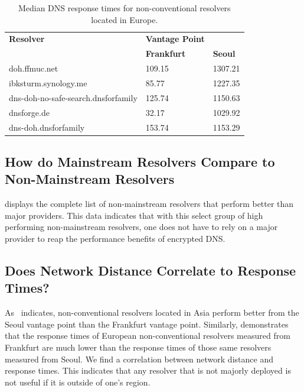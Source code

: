 \begin{table}
\centering
\begin{tabular}{lll}
\toprule
\textbf{Resolver} & \textbf{Vantage Point} & \\
                  & \textbf{Frankfurt}     & \textbf{Seoul} \\
\midrule
doh.ffmuc.net                               & 109.15                                           & 1307.21                         \\
ibksturm.synology.me                        & 85.77                                            & 1227.35                         \\
dns-doh-no-safe-search.dnsforfamily         & 125.74                                           & 1150.63                         \\
dnsforge.de                                 & 32.17                                            & 1029.92                         \\
dns-doh.dnsforfamily                        & 153.74                                           & 1153.29                         \\
\bottomrule
\end{tabular}
\caption{Median DNS response times for non-conventional resolvers located in Europe.}
\label{tab:UnconvEur}
\end{table}

\subsection{How do Mainstream Resolvers Compare to Non-Mainstream Resolvers}
 displays the complete list of non-mainstream resolvers that perform better than major providers.
This data indicates that with this select group of high performing non-mainstream resolvers, one does not have to rely on a major provider to reap the performance benefits of encrypted DNS.  

\subsection{Does Network Distance Correlate to Response Times?}
As~ indicates, non-conventional resolvers located in Asia perform better from the Seoul vantage point than the Frankfurt vantage point. 
Similarly,  demonstrates that the response times of European non-conventional resolvers measured from Frankfurt are much lower than the response times of those same resolvers measured from Seoul. 
We find a correlation between network distance and response times.
This indicates that any resolver that is not majorly deployed is not useful if it is outside of one's region. 
